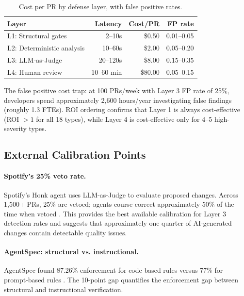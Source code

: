 \documentclass[11pt, a4paper, copyright]{googledeepmind}
\begin{document}
\begin{table}[htbp]
\centering
\caption{Cost per PR by defense layer, with false positive rates.}
\label{tab:costs}
\small
\begin{tabular}{@{}l r r r@{}}
\toprule
\textbf{Layer} & \textbf{Latency} & \textbf{Cost/PR} & \textbf{FP rate} \\
\midrule
L1: Structural gates & 2--10s & \$0.50 & 0.01--0.05 \\
L2: Deterministic analysis & 10--60s & \$2.00 & 0.05--0.20 \\
L3: LLM-as-Judge & 20--120s & \$8.00 & 0.15--0.35 \\
L4: Human review & 10--60 min & \$80.00 & 0.05--0.15 \\
\bottomrule
\end{tabular}
\end{table}

The false positive cost trap: at 100 PRs/week with Layer 3 FP rate of 25\%, developers spend approximately 2,600 hours/year investigating false findings (roughly 1.3 FTEs). ROI ordering confirms that Layer 1 is always cost-effective (ROI $> 1$ for all 18 types), while Layer 4 is cost-effective only for 4--5 high-severity types.

\subsection{External Calibration Points}

\paragraph{Spotify's 25\% veto rate.} Spotify's Honk agent uses LLM-as-Judge to evaluate proposed changes. Across 1,500+ PRs, 25\% are vetoed; agents course-correct approximately 50\% of the time when vetoed \citep{spotify2025}. This provides the best available calibration for Layer 3 detection rates and suggests that approximately one quarter of AI-generated changes contain detectable quality issues.

\paragraph{AgentSpec: structural vs. instructional.} AgentSpec found 87.26\% enforcement for code-based rules versus 77\% for prompt-based rules \citep{wang2026agentspec}. The 10-point gap quantifies the enforcement gap between structural and instructional verification.
\end{document}
